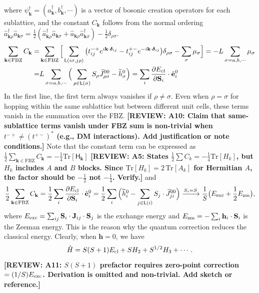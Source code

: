 \documentclass[aps, prx, nofootinbib, superscriptaddress]{revtex4-2}
\newcommand{\REVIEW}[1]{{\color{reviewcolor}\bfseries [REVIEW: #1]}}
\newcommand{\Tr}{\mathrm{Tr}}
\begin{document}
where $\psi^{\dagger}_{\mathbf{k}} = (a^{\dagger}_{\mathbf{k}}, b^{\dagger}_{\mathbf{k}}, \cdots)$ is a vector of bosonic creation operators for each sublattice, and the constant $C_{\mathbf{k}}$ follows from the normal ordering $\hat{a}_{\mathbf{k}\rho}^{\dagger} \hat{a}_{\mathbf{k}\sigma} = \frac{1}{2} (\hat{a}_{\mathbf{k}\rho}^{\dagger} \hat{a}_{ \mathbf{k}\sigma} + \hat{a}_{ \mathbf{k}\rho} \hat{a}_{\mathbf{k}\sigma}^{\dagger} ) - \frac{1}{2} \delta_{\rho\sigma}$.
\begin{align}
    \sum_{\mathbf{k} \in \mathrm{FBZ}} C_{\mathbf{k}} 
    = & \sum_{\mathbf{k} \in \mathrm{FBZ}} \Big[
    \sum_{\mathsf{L}(i\sigma,j\rho)} \big( t^{-+}_{ij} e^{i \mathbf{k} \cdot \bm{\delta}_{ij}} - t^{+-}_{ij} e^{-i \mathbf{k} \cdot \bm{\delta}_{ij}}\big) \delta_{\rho\sigma}    - \sum_{\sigma} \mu_{\sigma} \Big]
    = - L \sum_{\sigma = a, b, \cdots} \mu_{\sigma} \nonumber \\
    = & L \sum_{\sigma = a, b, \cdots} \Big( \sum_{\rho \in \mathsf{L}(\sigma)} S_{\rho} \widetilde{J}_{\rho\sigma}^{00} - \widetilde{h}_{\sigma}^{0} \Big) 
    = \sum_{i} \frac{\partial E_{\rm cl}}{\partial \mathbf{S}_{i}} \cdot \hat{\mathbf{e}}_{i}^{0} 
\end{align}
In the first line, the first term always vanishes if $\rho \neq \sigma$.
Even when $\rho = \sigma$ for hopping within the same sublattice but between different unit cells, these terms vanish in the summation over the FBZ.
\REVIEW{A10: Claim that same-sublattice terms vanish under FBZ sum is non-trivial when $t^{-+} \neq (t^{+-})^*$ (e.g., DM interactions). Add justification or note conditions.}
Note that the constant term can be expressed as $\frac{1}{2} \sum_{\mathbf{k} \in \mathrm{FBZ}}  C_{\mathbf{k}}  = - \frac{1}{4} \Tr[\mathsf{H}_{\mathbf{k}}]$
\REVIEW{A5: States $\frac{1}{2}\sum C_k = -\frac{1}{4}\mathrm{Tr}[H_k]$, but $H_k$ includes $A$ and $B$ blocks. Since $\mathrm{Tr}[H_k] = 2\,\mathrm{Tr}[A_k]$ for Hermitian $A$, the factor should be $-\frac{1}{2}$ not $-\frac{1}{4}$. Verify.}
and
\begin{equation}
    \frac{1}{2} \sum_{\mathbf{k} \in \mathrm{FBZ}}  C_{\mathbf{k}} 
    = \frac{1}{2} \sum_{i} \frac{\partial E_{\rm cl}}{\partial \mathbf{S}_{i}} \cdot \hat{\mathbf{e}}_{i}^{0} 
    = \frac{1}{2} \sum_{i} \Big( \widetilde{h}_{i}^{0} - \sum_{j \in \mathsf{L}(i)} S_{j} \cdot \widetilde{J}_{ji}^{00} \Big)
    \xrightarrow{ S_{i} = S}  
    \frac{1}{S} \big( E_{\rm exc} + \frac{1}{2}  E_{\rm zm} \big),
\end{equation}
where $ E_{\rm exc} = \sum_{ij} \mathbf{S}_i \cdot \mathbf{J}_{ij} \cdot \mathbf{S}_j $ is the exchange energy and $ E_{\rm zm} = - \sum_{i} \mathbf{h}_{i} \cdot \mathbf{S}_{i}$ is the Zeeman energy. 
This is the reason why the quantum correction reduces the classical energy. 
Clearly, when $\mathbf{h} = 0$, we have
\begin{equation}
    \hat{H} = S(S+1) E_{\rm cl} + S H_{2} + S^{1/2} H_{3} + \cdots .
\end{equation}
\REVIEW{A11: $S(S+1)$ prefactor requires zero-point correction $= (1/S)E_{\rm exc}$. Derivation is omitted and non-trivial. Add sketch or reference.}
\end{document}
